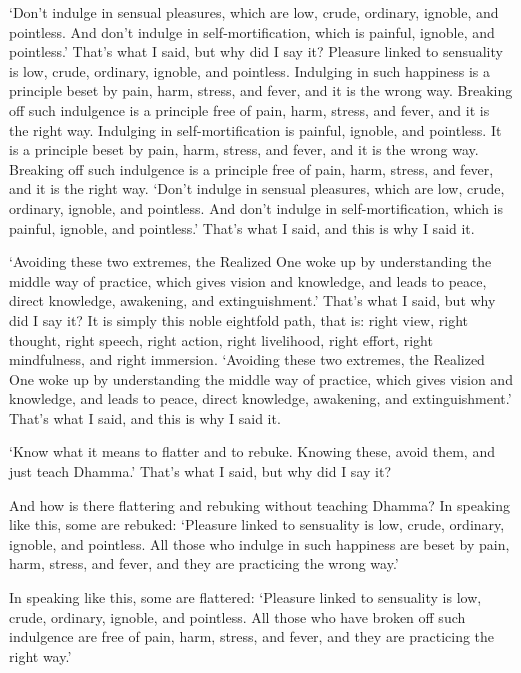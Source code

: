 \documentclass[12pt,openany]{book}%
\begin{document}
‘Don’t indulge in sensual pleasures, which are low, crude, ordinary, ignoble, and pointless. And don’t indulge in self-mortification, which is painful, ignoble, and pointless.’ That’s what I said, but why did I say it? Pleasure linked to sensuality is low, crude, ordinary, ignoble, and pointless. Indulging in such happiness is a principle beset by pain, harm, stress, and fever, and it is the wrong way. Breaking off such indulgence is a principle free of pain, harm, stress, and fever, and it is the right way. Indulging in self-mortification is painful, ignoble, and pointless. It is a principle beset by pain, harm, stress, and fever, and it is the wrong way. Breaking off such indulgence is a principle free of pain, harm, stress, and fever, and it is the right way. ‘Don’t indulge in sensual pleasures, which are low, crude, ordinary, ignoble, and pointless. And don’t indulge in self-mortification, which is painful, ignoble, and pointless.’ That’s what I said, and this is why I said it. 

‘Avoiding these two extremes, the Realized One woke up by understanding the middle way of practice, which gives vision and knowledge, and leads to peace, direct knowledge, awakening, and extinguishment.’ That’s what I said, but why did I say it? It is simply this noble eightfold path, that is: right view, right thought, right speech, right action, right livelihood, right effort, right mindfulness, and right immersion. ‘Avoiding these two extremes, the Realized One woke up by understanding the middle way of practice, which gives vision and knowledge, and leads to peace, direct knowledge, awakening, and extinguishment.’ That’s what I said, and this is why I said it. 

‘Know what it means to flatter and to rebuke. Knowing these, avoid them, and just teach Dhamma.’ That’s what I said, but why did I say it? 

And how is there flattering and rebuking without teaching Dhamma? In speaking like this, some are rebuked: ‘Pleasure linked to sensuality is low, crude, ordinary, ignoble, and pointless. All those who indulge in such happiness are beset by pain, harm, stress, and fever, and they are practicing the wrong way.’ 

In speaking like this, some are flattered: ‘Pleasure linked to sensuality is low, crude, ordinary, ignoble, and pointless. All those who have broken off such indulgence are free of pain, harm, stress, and fever, and they are practicing the right way.’ 
\end{document}
